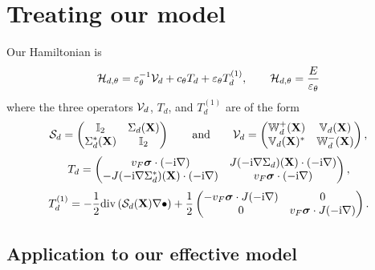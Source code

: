 \documentclass[11pt,a4paper,reqno,french,tikz]{amsart}
\let\p\relax\newcommand{\p}{\psi} %
\newcommand{\bbV}{\mathbb{V}}
\def\bX{{\mathbf X}}
\def\bbI{{\mathbb I}}
\def\bbV{{\mathbb V}}
\def\bbW{{\mathbb W}}
\def\ri{{\rm i}}
\newcommand{\ept}{\varepsilon_\theta}
\def\bsigma{{\boldsymbol\sigma}}
\begin{document}
\section{Treating our model}


Our Hamiltonian is
\begin{equation} \label{eq:def:Sigma_d}
    \cH_{d, \theta} = \ept^{-1} \cV_d + c_\theta T_d + \ept T_d^{(1)},\qquad \cH_{d,\theta} \p = \frac{E}{\ept} \p
\end{equation}
where the three operators $\mathcal{V}_d$, $T_d$, and $T_d^{(1)}$ are of the form
\begin{align*}
\cS_d =  \begin{pmatrix}
        \bbI_2 & \Sigma_d(\bX) \\ \Sigma_d^*(\bX) & \bbI_2
    \end{pmatrix} \qquad \mbox{and} \qquad \cV_d = \begin{pmatrix}
        \bbW_d^+(\bX) & \bbV_d(\bX) \\
        \bbV_d(\bX)^* & \bbW_d^-(\bX)
    \end{pmatrix} ,
\end{align*}
\[
    T_d = \begin{pmatrix} v_F \bsigma \cdot ( - \ri \nabla) &  J ( - \ri \nabla \Sigma_d)(\bX) \cdot ( - \ri \nabla) \\
       -  J ( - \ri \nabla \Sigma_d^*)(\bX) \cdot ( - \ri \nabla) & v_F \bsigma \cdot ( - \ri \nabla) \end{pmatrix},
\]
\begin{equation} \label{eq:op_Td1}
    T_d^{(1)} = - \frac12 {\rm div} \left( \cS_d(\bX) \nabla \bullet \right) + \frac12 \begin{pmatrix}
        - v_F \bsigma \cdot J (- \ri \nabla) & 0 \\
        0 & v_F \bsigma \cdot J (- \ri \nabla) \end{pmatrix}.
\end{equation}


\subsection{Application to our effective model}%
\label{sub:application_to_our_effective_model}
\end{document}
